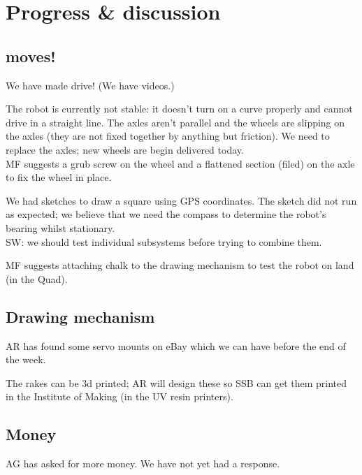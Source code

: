 \documentclass[a4paper,11pt,twoside,class=meetingmins,crop=false]{standalone}
\begin{document}
\section{Progress \& discussion}
\begin{items}
    \subsection{\SandE moves!}
        \item We have made \SandE drive! (We have videos.)
        \item The robot is currently not stable: it doesn't turn on a curve properly and cannot drive in a straight line. The axles aren't parallel and the wheels are slipping on the axles (they are not fixed together by anything but friction). We need to replace the axles; new wheels are begin delivered today.\\
        MF suggests a grub screw on the wheel and a flattened section (filed) on the axle to fix the wheel in place.
        \item We had sketches to draw a square using GPS coordinates. The sketch did not run as expected; we believe that we need the compass to determine the robot's bearing whilst stationary.\\
        SW: we should test individual subsystems before trying to combine them.
        \item MF suggests attaching chalk to the drawing mechanism to test the robot on land (in the Quad).
    \subsection{Drawing mechanism}
        \item AR has found some servo mounts on eBay which we can have before the end of the week.
        \item The rakes can be 3d printed; AR will design these so SSB can get them printed in the Institute of Making (in the UV resin printers).
    \subsection{Money}
        \item AG has asked for more money. We have not yet had a response.
\end{items}
\end{document}
